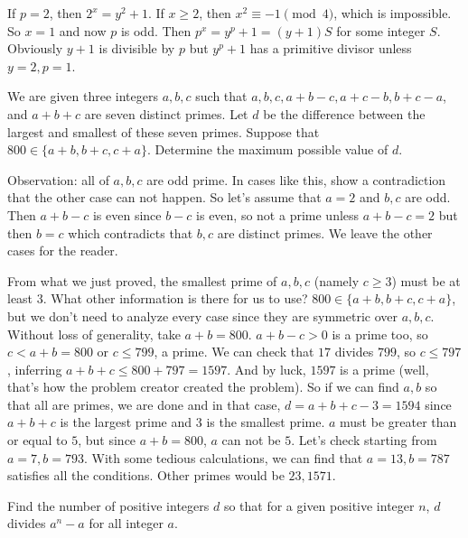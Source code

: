 \documentclass[problems.tex]{subfile}
\begin{document}
	\begin{solution}
		If $p=2$, then $2^x=y^2+1$. If $x\geq2$, then $x^2\equiv-1\pmod4$, which is impossible. So $x=1$ and now $p$ is odd. Then $p^x=y^p+1=(y+1)S$ for some integer $S$. Obviously $y+1$ is divisible by $p$ but $y^p+1$ has a primitive divisor unless $y=2,p=1$.
	\end{solution}

	\begin{problem}
		We are given three integers $a, b, c$ such that $a, b, c, a + b - c, a + c - b, b + c - a$, and $a + b + c$ are seven distinct primes. Let $d$ be the difference between the largest and smallest of these seven primes. Suppose that $800\in \{a+b, b+c, c+a\}$. Determine the maximum possible value of $d$.
	\end{problem}

	\begin{solution}
		Observation: all of $a,b,c$ are odd prime. In cases like this, show a contradiction that the other case can not happen. So let's assume that $a=2$ and $b,c$ are odd. Then $a+b-c$ is even since $b-c$ is even, so not a prime unless $a+b-c=2$ but then $b=c$ which contradicts that $b,c$ are distinct primes. We leave the other cases for the reader.

		From what we just proved, the smallest prime of $a,b,c$ (namely $c\geq3$) must be at least $3$. What other information is there for us to use? $800\in \{a+b, b+c, c+a\}$, but we don't need to analyze every case since they are symmetric over $a,b,c$. Without loss of generality, take $a+b=800$. $a+b-c>0$ is a prime too, so $c<a+b=800$ or $c\leq 799$, a prime. We can check that $17$ divides $799$, so $c\leq797$, inferring $a+b+c\leq800+797=1597$. And by luck, $1597$ is a prime (well, that's how the problem creator created the problem). So if we can find $a,b$ so that all are primes, we are done and in that case, $d=a+b+c-3=1594$ since $a+b+c$ is the largest prime and $3$ is the smallest prime. $a$ must be greater than or equal to $5$, but since $a+b=800$, $a$ can not be $5$. Let's check starting from $a=7,b=793$. With some tedious calculations, we can find that $a=13,b=787$ satisfies all the conditions. Other primes would be $23,1571$.
	\end{solution}

	\begin{problem}
		Find the number of positive integers $d$ so that for a given positive integer $n$, $d$ divides $a^n-a$ for all integer $a$.
	\end{problem}
\end{document}
